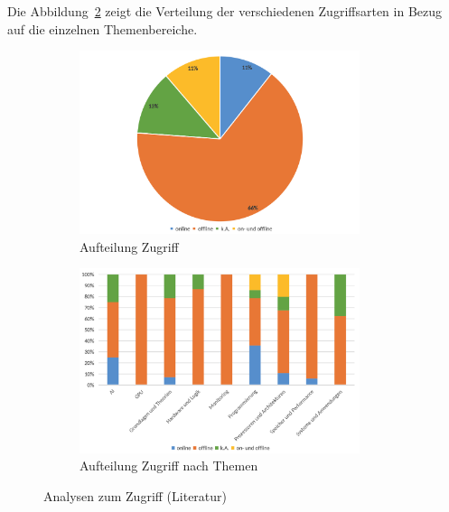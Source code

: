 Die Abbildung~\ref{fig:13-zugriff-thema} zeigt die Verteilung der verschiedenen Zugriffsarten in Bezug auf die einzelnen Themenbereiche.

\begin{figure}[!htbp]
    \centering
    \begin{subfigure}[b]{0.48\textwidth}
        \centering
        \includegraphics[width=0.90\textwidth]{graphics_lit/11-zugriff.png}
        \caption{Aufteilung Zugriff}
        \label{fig:11-zugriff}
    \end{subfigure}
    \hfill
    \begin{subfigure}[b]{0.48\textwidth}
        \centering
        \includegraphics[width=0.90\textwidth]{graphics_lit/13-zugriff-thema.png}
        \caption{Aufteilung Zugriff nach Themen}
        \label{fig:13-zugriff-thema}
    \end{subfigure}
    \caption{Analysen zum Zugriff (Literatur)}
    \label{fig:zugriff-analysen}
\end{figure}

